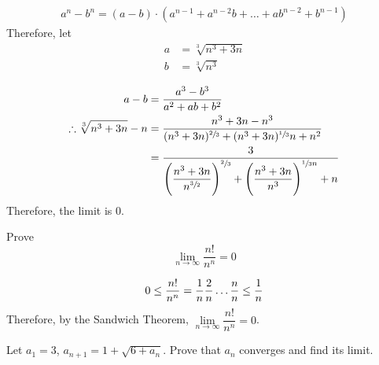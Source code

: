 \documentclass[fleqn, a4paper, 12pt, twoside]{article}
\theoremstyle{definition}
\theoremstyle{theorem}
\begin{document}
\begin{solution}[print]
	\begin{align*}
		a^n - b^n = (a - b) \cdot (a^{n - 1} + a^{n - 2} b + \dots + a b^{n - 2} + b^{n - 1})
	\end{align*}
	Therefore, let
	\begin{align*}
		a &= \sqrt[3]{n^3 + 3n}\\
		b &= \sqrt[3]{n^3}
	\end{align*}

	\begin{align*}
		a - b &= \dfrac{a^3 - b^3}{a^2 + a b + b^2}\\
		\therefore \sqrt[3]{n^3 + 3n} - n &= \dfrac{n^3 + 3n - n^3}{(n^3 + 3n)^{\sfrac{2}{3}} + (n^3 + 3n)^{\sfrac{1}{3}} n + n^2}\\
		&= \dfrac{3}{\left( \dfrac{n^3 + 3n}{n^{\sfrac{3}{2}}} \right)^{\sfrac{2}{3}} + \left( \dfrac{n^3 + 3n}{n^3} \right)^{\sfrac{1}{3} n} + n}
	\end{align*}
	Therefore, the limit is 0.
\end{solution}

\begin{question}
	Prove
	\begin{equation*}
		\lim\limits_{n \to \infty} \dfrac{n!}{n^n} = 0
	\end{equation*}
\end{question}

\begin{solution}[print]
	\begin{equation*}
		0 \leq \dfrac{n!}{n^n} = \dfrac{1}{n} \dfrac{2}{n} \dots \dfrac{n}{n} \leq \dfrac{1}{n}\\
	\end{equation*}
	Therefore, by the Sandwich Theorem, $\lim\limits_{n \to \infty} \dfrac{n!}{n^n} = 0$.
\end{solution}

\begin{question}
	Let $a_1 = 3$, $a_{n + 1} = 1 + \sqrt{6 + a_n}$. Prove that $a_n$ converges and find its limit.
\end{question}
\end{document}
